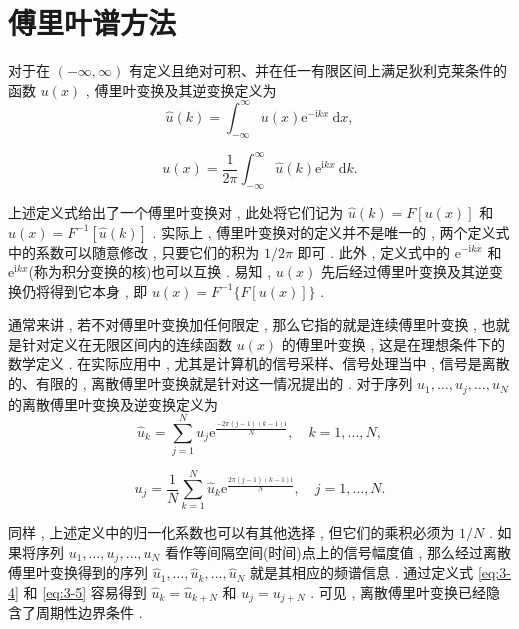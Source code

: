 \section{傅里叶谱方法}

对于在 $(-\infty , \infty)$ 有定义且绝对可积、并在任一有限区间上满足狄利克莱条件的函数 $u(x)$ , 傅里叶变换及其逆变换定义为
\begin{equation}
    \hat{u}(k) = \int_{-\infty}^{\infty} u(x) \mathrm{e}^{-\mathrm{i} k x} \mathrm{~d} x , \label{eq:3-1}
\end{equation}

\begin{equation}
    u(x) = \frac{1}{2 \pi} \int_{-\infty}^{\infty} \hat{u}(k) \mathrm{e}^{\mathrm{i} k x} \mathrm{~d} k . \label{eq:3-2}
\end{equation}

上述定义式给出了一个傅里叶变换对 , 此处将它们记为 $\hat{u}(k) = F[u(x)]$ 和 $u(x) = F^{-1}[\hat{u}(k)]$ . 实际上 , 傅里叶变换对的定义并不是唯一的 , 两个定义式中的系数可以随意修改 , 只要它们的积为 $1 / 2 \pi$ 即可 . 此外 , 定义式中的 $\mathrm{e}^{-\mathrm{i} k x}$ 和 $\mathrm{e}^{\mathrm{i} k x}$(称为积分变换的核)也可以互换 . 
易知 , $u(x)$ 先后经过傅里叶变换及其逆变换仍将得到它本身 , 即 $u(x) = F^{-1}\{F[u(x)]\}$ . 

通常来讲 , 若不对傅里叶变换加任何限定 , 那么它指的就是连续傅里叶变换 , 也就是针对定义在无限区间内的连续函数 $u(x)$ 的傅里叶变换 , 这是在理想条件下的数学定义 . 在实际应用中 , 尤其是计算机的信号采样、信号处理当中 , 信号是离散的、有限的 , 离散傅里叶变换就是针对这一情况提出的 . 
对于序列 $u_1 , \ldots , u_j , \ldots , u_N$ 的离散傅里叶变换及逆变换定义为\cite{ZhangXiaoMatlabWeiFenFangChengGaoXiaoJieFaPuFangFaYuanLiYuShiXian2015}
\begin{equation}
    \hat{u}_k = \sum_{j=1}^N u_j \mathrm{e}^{\frac{-2 \pi(j-1)(k-1) \mathrm{i}}{N}} , \quad k=1 , \ldots , N , \label{eq:3-4}
\end{equation}

\begin{equation}
    u_j = \frac{1}{N} \sum_{k=1}^N \hat{u}_k \mathrm{e}^{\frac{2 \pi(j-1)(k-1) \mathrm{i}}{N}} , \quad j=1 , \ldots , N . \label{eq:3-5}
\end{equation}

同样 , 上述定义中的归一化系数也可以有其他选择 , 但它们的乘积必须为 $1 / N$ . 如果将序列 $u_1 , \ldots , u_j , \ldots , u_N$ 看作等间隔空间(时间)点上的信号幅度值 , 那么经过离散傅里叶变换得到的序列 $\hat{u}_1 , \ldots , \hat{u}_k , \ldots , \hat{u}_N$ 就是其相应的频谱信息 . 
通过定义式 \eqref{eq:3-4} 和 \eqref{eq:3-5} 容易得到 $\hat{u}_k = \hat{u}_{k+N}$ 和 $u_j = u_{j+N}$ . 可见 , 离散傅里叶变换已经隐含了周期性边界条件 . 

